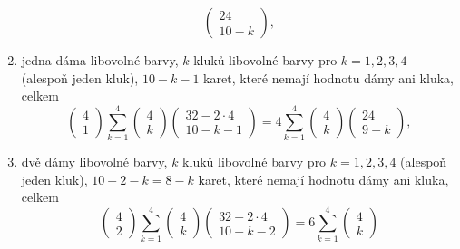 \begin{example}
\begin{enumerate}
\begin{equation*}
                            \begin{pmatrix} 24 \\ 10 - k \end{pmatrix},
            \end{equation*}
      \item jedna dáma libovolné barvy, \(k\) kluků libovolné barvy pro \(k = 1,2, 3, 4\) (alespoň 
            jeden kluk), \(10 - k - 1\) karet, které nemají hodnotu dámy ani kluka, celkem
            \begin{equation*}
              \begin{pmatrix} 4  \\ 1 \end{pmatrix}
              \sum^{4}_{k=1}\begin{pmatrix} 4  \\ k \end{pmatrix}
                            \begin{pmatrix} 32 - 2\cdot4 \\ 10 - k - 1 \end{pmatrix} =
              4\sum^{4}_{k=1}\begin{pmatrix} 4  \\ k \end{pmatrix}
                            \begin{pmatrix} 24 \\ 9 - k \end{pmatrix},
            \end{equation*}
      \item dvě dámy libovolné barvy, \(k\) kluků libovolné barvy pro \(k = 1, 2, 3, 4\) (alespoň 
            jeden kluk), \(10 - 2 - k = 8 - k\) karet, které nemají hodnotu dámy ani kluka, celkem
            \begin{equation*}
              \begin{pmatrix} 4  \\ 2 \end{pmatrix}
              \sum^{4}_{k=1}\begin{pmatrix} 4  \\ k \end{pmatrix}
                            \begin{pmatrix} 32 - 2\cdot4 \\ 10 - k - 2 \end{pmatrix} =
              6\sum^{4}_{k=1}\begin{pmatrix} 4  \\ k \end{pmatrix}

\end{equation*}
\end{enumerate}
\end{example}
